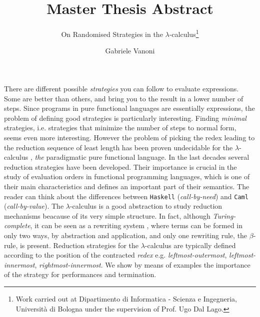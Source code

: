 \documentclass[english]{llncs}
\begin{document}
\title{Master Thesis Abstract}
\subtitle{On Randomised Strategies in the $\lambda$-calculus\thanks{Work carried out at Dipartimento di Informatica - Scienza e Ingegneria, Università di Bologna under the supervision of Prof. Ugo Dal Lago.}}
\author{Gabriele Vanoni}
\maketitle
There are different possible \emph{strategies} you can follow to evaluate expressions. Some are better than others, and bring you to the result in a lower number of steps. Since programs in pure functional languages are essentially expressions, the problem of defining good strategies is particularly interesting. Finding \emph{minimal} strategies, i.e. strategies that minimize the number of steps to normal form, seems even more interesting. However the problem of picking the redex leading to the reduction sequence of least length has been proven undecidable for the $\lambda$-calculus \cite[Section~13.5]{barendregt_lambda_1984}, \emph{the} paradigmatic pure functional language. In the last decades several reduction strategies have been developed. Their importance is crucial in the study of evaluation orders in functional programming languages, which is one of their main characteristics and defines an important part of their semantics. The reader can think about the differences between \texttt{Haskell} (\emph{call-by-need}) and \texttt{Caml} (\emph{call-by-value}). The $\lambda$-calculus is a good abstraction to study reduction mechanisms beacause of its very simple structure. In fact, although \emph{Turing-complete}, it can be seen as a rewriting system \cite{terese_term_2003}, where terms can be formed in only two ways, by abstraction and application, and only one rewriting rule, the $\beta$-rule, is present. Reduction strategies for the $\lambda$-calculus are typically defined according to the position of the contracted \emph{redex} e.g. \emph{leftmost-outermost}, \emph{leftmost-innermost}, \emph{rightmost-innermost}. We show by means of examples the importance of the strategy for performances and termination.
\end{document}
